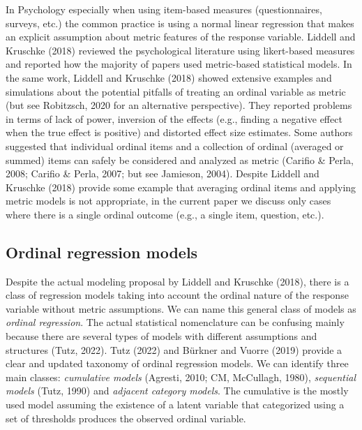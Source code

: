 \documentclass[
  man,floatsintext]{apa6}
\begin{document}
In Psychology especially when using item-based measures (questionnaires, surveys, etc.) the common practice is using a normal linear regression that makes an explicit assumption about metric features of the response variable. Liddell and Kruschke (2018) reviewed the psychological literature using likert-based measures and reported how the majority of papers used metric-based statistical models. In the same work, Liddell and Kruschke (2018) showed extensive examples and simulations about the potential pitfalls of treating an ordinal variable as metric (but see Robitzsch, 2020 for an alternative perspective). They reported problems in terms of lack of power, inversion of the effects (e.g., finding a negative effect when the true effect is positive) and distorted effect size estimates. Some authors suggested that individual ordinal items and a collection of ordinal (averaged or summed) items can safely be considered and analyzed as metric (Carifio \& Perla, 2008; Carifio \& Perla, 2007; but see Jamieson, 2004). Despite Liddell and Kruschke (2018) provide some example that averaging ordinal items and applying metric models is not appropriate, in the current paper we discuss only cases where there is a single ordinal outcome (e.g., a single item, question, etc.).

\subsection{Ordinal regression models}\label{ordinal-regression-models}

Despite the actual modeling proposal by Liddell and Kruschke (2018), there is a class of regression models taking into account the ordinal nature of the response variable without metric assumptions. We can name this general class of models as \emph{ordinal regression}. The actual statistical nomenclature can be confusing mainly because there are several types of models with different assumptions and structures (Tutz, 2022). Tutz (2022) and Bürkner and Vuorre (2019) provide a clear and updated taxonomy of ordinal regression models. We can identify three main classes: \emph{cumulative models} (Agresti, 2010; CM, McCullagh, 1980), \emph{sequential models} (Tutz, 1990) and \emph{adjacent category models}. The cumulative is the mostly used model assuming the existence of a latent variable that categorized using a set of thresholds produces the observed ordinal variable.
\end{document}
